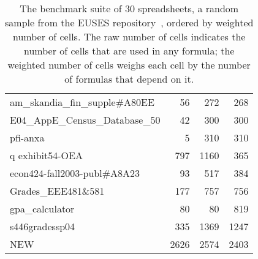 \begin{table}[!t]
\begin{tabular}{l|rrr}
\small{am\_skandia\_fin\_supple\#A80EE} & \small{56} & \small{272} & \small{268} \\ 
\small{E04\_AppE\_Census\_Database\_50} & \small{42} & \small{300} & \small{300} \\ 
\small{pfi-anxa} & \small{5} & \small{310} & \small{310} \\ 
\small{q exhibit54-OEA} & \small{797} & \small{1160} & \small{365} \\ 
\small{econ424-fall2003-publ\#A8A23} & \small{93} & \small{517} & \small{384} \\ 
\small{Grades\_EEE481\&581} & \small{177} & \small{757} & \small{756} \\ 
\small{gpa\_calculator} & \small{80} & \small{80} & \small{819} \\ 
\small{s446gradessp04} & \small{335} & \small{1369} & \small{1247} \\ 
\small{NEW} & \small{2626} & \small{2574} & \small{2403} \\ 
    \end{tabular}%
  \caption{The benchmark suite of 30 spreadsheets, a random sample from the EUSES repository~\cite{Fisher:2005:ESC:1082983.1083242}, ordered by weighted number of cells. The raw number of cells indicates the number of cells that are used in any formula; the weighted number of cells weighs each cell by the number of formulas that depend on it.\label{tab:spreadsheet_characteristics}}
\end{table}

